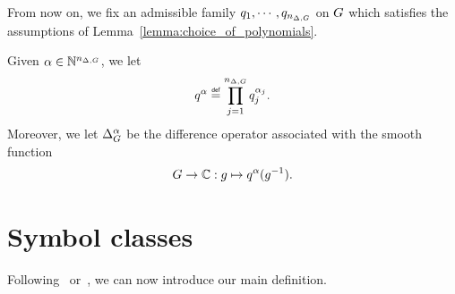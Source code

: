 \begin{remark}
    From now on, we fix an admissible family $q_1, \cdots, q_{n_{\Delta, G}}$ on $G$
    which satisfies the assumptions of Lemma~\ref{lemma:choice_of_polynomials}.

    Given $\alpha \in \mathbb{N}^{n_{\Delta, G}}$, we let
    \begin{align*}
        q^\alpha \defeq \prod_{j = 1}^{\dimDifferenceOperators} q_j^{\alpha_j}.
    \end{align*}
    Moreover, we let ${\Delta_{G}^{\alpha}}$ be the difference operator associated with the smooth function
    \begin{align*}
        G \to \mathbb{C} : g \mapsto q^\alpha(g^{-1}).
    \end{align*}
\end{remark}

\section{Symbol classes}

Following~\cite{RuzhanskyTurunen10} or~\cite{FischerRuzhansky16},
we can now introduce our main definition.

